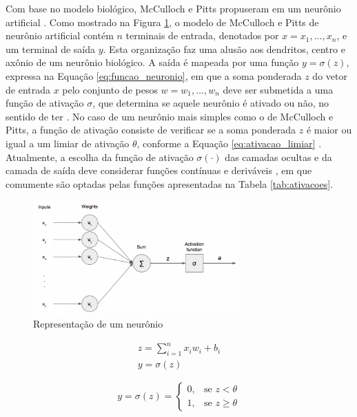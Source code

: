 Com base no modelo biológico, McCulloch e Pitts propuseram em  um neurônio artificial \cite{mcculloch1943logical}. Como mostrado na Figura \ref{fig:neuronio}, o modelo de McCulloch e Pitts de neurônio artificial contém $n$ terminais de entrada, denotados por $x = x_1, \ldots, x_n$, e um terminal de saída $y$. Esta organização faz uma alusão aos dendritos, centro e axônio de um neurônio biológico. A saída é mapeada por uma função $y = \sigma(z)$, expressa na Equação \ref{eq:funcao_neuronio}, em que a soma ponderada $z$ do vetor de entrada $x$ pelo conjunto de pesos $w = w_1, \ldots, w_n$
deve ser submetida a uma função de ativação $\sigma$, que determina se aquele neurônio é ativado ou não, no sentido de ter . No caso de um neurônio mais simples como o de McCulloch e Pitts, a função de ativação consiste de verificar se a soma ponderada $z$ é maior ou igual a um limiar de ativação $\theta$, conforme a Equação \ref{eq:ativacao_limiar} \cite{mcculloch1943logical}. Atualmente, a escolha da função de ativação $\sigma(\cdot)$ das camadas ocultas e da camada de saída deve considerar funções contínuas e deriváveis \cite{hornik1991approximation}, em que comumente são optadas pelas funções apresentadas na Tabela  \ref{tab:ativacoes}.

\begin{figure}[ht]
	\centering
	\includegraphics[width=0.7\textwidth]{img/perceptron.png}
	\caption{Representação de um neurônio}
	\label{fig:neuronio}
\end{figure}

\begin{gather}\label{eq:funcao_neuronio}
	z = \sum_{i=1}^n x_i w_i + b_i\\
	y = \sigma(z)
\end{gather}

\begin{equation}\label{eq:ativacao_limiar}
	y = \sigma(z) =
		\begin{cases}
			0, & \text{se } z < \theta\\
			1, & \text{se } z \geq \theta
		\end{cases}
\end{equation}


